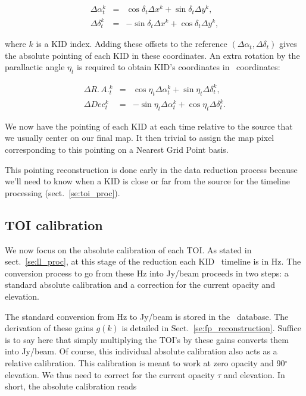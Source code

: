 \begin{eqnarray}
\Delta\alpha^k_t &=&  \cos\delta_t \Delta x^k + \sin\delta_t \Delta y^k, \nonumber\\
\Delta\delta^k_t &=& -\sin\delta_t \Delta x^k + \cos\delta_t \Delta y^k, \nonumber
\end{eqnarray}

where $k$ is a KID index. Adding these offsets to the reference $(\Delta
\alpha_t, \Delta \delta_t)$ gives the absolute pointing of each KID in these
coordinates. An extra rotation by the parallactic angle $\eta_t$ is required to
obtain KID's coordinates in \radec\ coordinates:

\begin{eqnarray}
\Delta R.\,A.^k_t &=&  \cos\eta_t \Delta\alpha^k_t + \sin\eta_t \Delta\delta^k_t,\\
\Delta Dec^k_t    &=& -\sin\eta_t \Delta\alpha^k_t + \cos\eta_t \Delta\delta^k_t.
\end{eqnarray}

We now have the pointing of each KID at each time relative to the source that we
usually center on our final map. It then trivial to assign the map pixel
corresponding to this pointing on a Nearest Grid Point basis.

This pointing reconstruction is done early in the data reduction process because
we'll need to know when a KID is close or far from the source for the timeline
processing (sect.~\ref{se:toi_proc}).

\subsection{TOI calibration}
\label{se:flux_calib}

We now focus on the absolute calibration of each TOI. As stated in
sect.~\ref{se:ll_proc}, at this stage of the reduction each KID \rf~timeline is
in Hz. The conversion process to go from these Hz into Jy/beam proceeds in two
steps: a standard absolute calibration and a correction for the current opacity
and elevation.

The standard conversion from Hz to Jy/beam is stored in the
\kidpar\ database. The derivation of these gains $g(k)$ is detailed in
Sect.~\ref{se:fp_reconstruction}. Suffice is to say here that simply multiplying
the TOI's by these gains converts them into Jy/beam. Of course, this individual
absolute calibration also acts as a relative calibration. This calibration is
meant to work at zero opacity and 90$^\circ$ elevation. We thus need to correct
for the current opacity $\tau$ and elevation. In short, the absolute calibration reads

